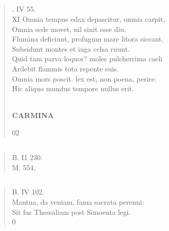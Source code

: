 \documentclass[11pt, a4paper]{report}
\begin{document}
            \subsection*{}
      \begin{verse}
      . IV 55. \\ XI Omnia tempus edax depascitur, omnia carpit, \\ Omnia sede movet, nil sinit esse diu. \\ Flumina deficiunt, profugum mare litora siccant, \\ Subsidunt montes et iuga celsa ruunt. \\ Quid tam parva loquor? moles pulcherrima caeli \\ Ardebit flammis tota repente suis. \\ Omnia mors poscit. lex est, non poena, perire: \\ Hic aliquo mundus tempore nullus erit. \\ 
        ﻿\pagebreak 
     \marginpar{[192]} \begin{center} \textbf{CARMINA} \end{center}02 \\ 
      \end{verse}
  
            \subsection*{}
      \begin{verse}
      B. I1 230. \\ M. 554. \\ 
      \end{verse}
  
            \subsection*{}
      \begin{verse}
      B. IV 102. \\ Mantua, da veniam, fama sacrata perenni: \\ Sit fas Thessaliam post Simoenta legi. \\ 0 \\ 
      \end{verse}
  
\end{document}
